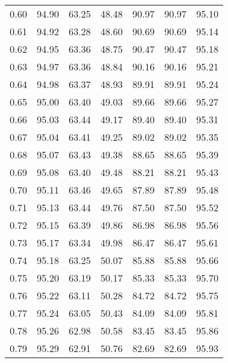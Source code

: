 \begin{tabular}{|c|c|c|c|c|c|c|}
      0.60 &     94.90 &     63.25 &      48.48 &   90.97 &      90.97 &         95.10 \\
      0.61 &     94.92 &     63.28 &      48.60 &   90.69 &      90.69 &         95.14 \\
      0.62 &     94.95 &     63.36 &      48.75 &   90.47 &      90.47 &         95.18 \\
      0.63 &     94.97 &     63.36 &      48.84 &   90.16 &      90.16 &         95.21 \\
      0.64 &     94.98 &     63.37 &      48.93 &   89.91 &      89.91 &         95.24 \\
      0.65 &     95.00 &     63.40 &      49.03 &   89.66 &      89.66 &         95.27 \\
      0.66 &     95.03 &     63.44 &      49.17 &   89.40 &      89.40 &         95.31 \\
      0.67 &     95.04 &     63.41 &      49.25 &   89.02 &      89.02 &         95.35 \\
      0.68 &     95.07 &     63.43 &      49.38 &   88.65 &      88.65 &         95.39 \\
      0.69 &     95.08 &     63.40 &      49.48 &   88.21 &      88.21 &         95.43 \\
      0.70 &     95.11 &     63.46 &      49.65 &   87.89 &      87.89 &         95.48 \\
      0.71 &     95.13 &     63.44 &      49.76 &   87.50 &      87.50 &         95.52 \\
      0.72 &     95.15 &     63.39 &      49.86 &   86.98 &      86.98 &         95.56 \\
      0.73 &     95.17 &     63.34 &      49.98 &   86.47 &      86.47 &         95.61 \\
      0.74 &     95.18 &     63.25 &      50.07 &   85.88 &      85.88 &         95.66 \\
      0.75 &     95.20 &     63.19 &      50.17 &   85.33 &      85.33 &         95.70 \\
      0.76 &     95.22 &     63.11 &      50.28 &   84.72 &      84.72 &         95.75 \\
      0.77 &     95.24 &     63.05 &      50.43 &   84.09 &      84.09 &         95.81 \\
      0.78 &     95.26 &     62.98 &      50.58 &   83.45 &      83.45 &         95.86 \\
      0.79 &     95.29 &     62.91 &      50.76 &   82.69 &      82.69 &         95.93 \\

\end{tabular}
